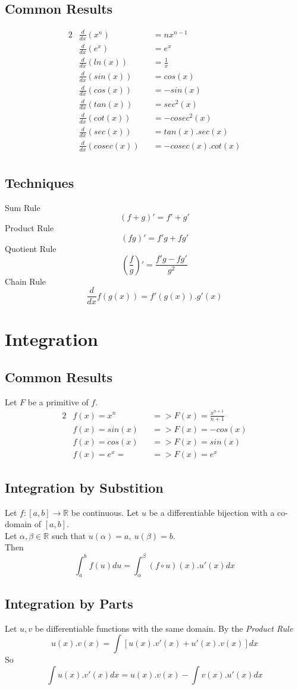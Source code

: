 \documentclass[11pt,a4paper]{article}
\begin{document}
\subsection{Common Results}
\begin{alignat*}{2}
  &\frac{d}{dx}(x^n) &&= nx^{n-1} \\
  &\frac{d}{dx}(e^x) &&= e^x \\
  &\frac{d}{dx}(ln(x)) &&= \frac{1}{x}\\
  &\frac{d}{dx}(sin(x)) &&= cos(x) \\
  &\frac{d}{dx}(cos(x)) &&= -sin(x) \\
  &\frac{d}{dx}(tan(x)) &&= sec^2(x) \\
  &\frac{d}{dx}(cot(x)) &&= -cosec^2(x) \\
  &\frac{d}{dx}(sec(x)) &&= tan(x).sec(x) \\
  &\frac{d}{dx}(cosec(x)) &&= -cosec(x).cot(x) \\
\end{alignat*}

\subsection{Techniques}
Sum Rule
$$(f+g)' = f' + g'$$
%
Product Rule
$$(fg)' = f'g + fg'$$
%
Quotient Rule
$$\left(\frac{f}{g}\right)' = \frac{f'g - fg'}{g^2}$$
%
Chain Rule
$$\frac{d}{dx} f(g(x)) = f'(g(x)).g'(x)$$

\section{Integration}
\subsection{Common Results}
Let $F$ be a primitive of $f$.
\begin{alignat*}{2}
  &f(x) = x^n &&=> F(x) = \frac{x^{n+1}}{n+1} \\
  &f(x) = sin(x) &&=> F(x) = -cos(x) \\
  &f(x) = cos(x) &&=> F(x) = sin(x) \\
  &f(x) = e^x = &&=> F(x) = e^x
\end{alignat*}

\subsection{Integration by Substition}
Let $f : [a, b] \to \mathbb{R}$ be continuous.
Let $u$ be a differentiable bijection with a co-domain of $[a, b]$. \\
Let $\alpha, \beta \in \mathbb{R}$ such that $u(\alpha) = a,\ u(\beta) = b$. \\
Then $$\displaystyle{\int_{a}^{b} f(u) du = \int_{\alpha}^{\beta}(f \circ u)(x).u'(x) dx}$$

\subsection{Integration by Parts}
Let $u, v$ be differentiable functions with the same domain.
By the \textit{Product Rule} $$u(x).v(x) = \int\left[u(x).v'(x) + u'(x).v(x) \right]dx$$
So $$\int u(x).v'(x) dx = u(x).v(x) - \int v(x).u'(x) dx$$
\end{document}
